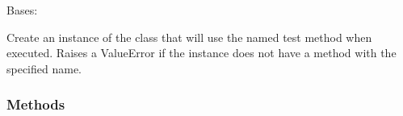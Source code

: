 \documentclass[letterpaper,10pt,english]{sphinxmanual}
\begin{document}
\begin{fulllineitems}
\label{\detokenize{_autosummary/tests.test_unit.test_sqlite:tests.test_unit.test_sqlite}}
\pysigstartsignatures
{}
\pysigstopsignatures
\sphinxAtStartPar
Bases: 

\begin{fulllineitems}
\label{\detokenize{_autosummary/tests.test_unit.test_sqlite:tests.test_unit.test_sqlite.__init__}}
\pysigstartsignatures
{}
\pysigstopsignatures
\sphinxAtStartPar
Create an instance of the class that will use the named test
method when executed. Raises a ValueError if the instance does
not have a method with the specified name.

\end{fulllineitems}

\subsubsection*{Methods}


\begin{savenotes}
\sphinxatlongtablestart
\sphinxthistablewithglobalstyle
\sphinxthistablewithnovlinesstyle
\begin{longtable}[c]{}
\sphinxtoprule
\endfirsthead

\\
\sphinxtoprule
\endhead

\sphinxbottomrule
{}\\
\endfoot

\endlastfoot
\sphinxtableatstartofbodyhook


\end{longtable}
\end{savenotes}
\end{fulllineitems}
\end{document}
